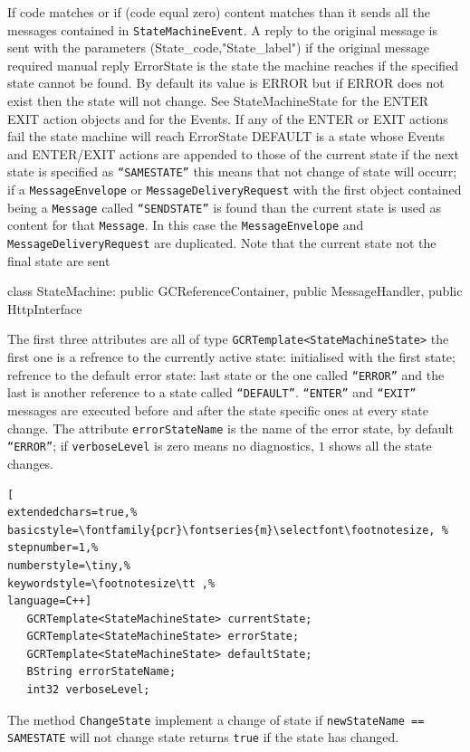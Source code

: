 If code matches or if (code equal zero) content matches than it sends all the messages contained in \texttt{StateMachineEvent}. A reply to the original message is sent with the parameters (State\_code,"State\_label") if the original message required manual reply ErrorState is the state the machine reaches if the specified state cannot be found. By default its value is ERROR but if ERROR does not exist then the state will not change. See StateMachineState for the ENTER EXIT action objects and for the Events. If any of the ENTER or EXIT actions fail the state machine will reach ErrorState DEFAULT is a state whose Events and ENTER/EXIT actions are appended to those of the current state if the next state is specified as \texttt{``SAMESTATE''} this means that not change of state will occurr; if a \texttt{MessageEnvelope} or \texttt{MessageDeliveryRequest} with the first object contained being a \texttt{Message}  called \texttt{``SENDSTATE''} is found than the current state is used as content for that \texttt{Message}. In this case the \texttt{MessageEnvelope} and \texttt{MessageDeliveryRequest} are duplicated. Note that the current state not the final state are sent 

class StateMachine: public GCReferenceContainer, public MessageHandler, public HttpInterface



The first three attributes are all of type \texttt{GCRTemplate<StateMachineState>} the first one is a refrence to the currently active state: initialised with the first state; refrence to the default error state: last state or the one called \texttt{``ERROR''} and the last is another reference to a state called \texttt{``DEFAULT''}. \texttt{``ENTER''} and \texttt{``EXIT''} messages are executed before and after the state specific ones at every state change.
The attribute \texttt{errorStateName} is the name of the error state, by default \texttt{``ERROR''}; if \texttt{verboseLevel} is zero means no diagnostics, $1$ shows all the state changes.
\begin{lstlisting}[
extendedchars=true,%
basicstyle=\fontfamily{pcr}\fontseries{m}\selectfont\footnotesize, %
stepnumber=1,%
numberstyle=\tiny,%
keywordstyle=\footnotesize\tt ,%
language=C++]
   GCRTemplate<StateMachineState> currentState;
   GCRTemplate<StateMachineState> errorState;
   GCRTemplate<StateMachineState> defaultState;
   BString errorStateName;
   int32 verboseLevel;
\end{lstlisting}

The method \texttt{ChangeState} implement a change of state if \texttt{newStateName == SAMESTATE} will not change state returns \texttt{true} if the state has changed.

